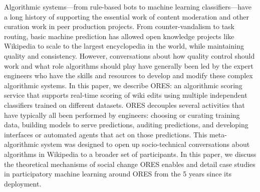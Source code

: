 Algorithmic systems---from rule-based bots to machine learning classifiers---have a long history of supporting the essential work of content moderation and other curation work in peer production projects.  From counter-vandalism to task routing, basic machine prediction has allowed open knowledge projects like Wikipedia to scale to the largest encyclopedia in the world, while maintaining quality and consistency.  However, conversations about how quality control should work and what role algorithms should play have generally been led by the expert engineers who have the skills and resources to develop and modify these complex algorithmic systems. In this paper, we describe ORES: an algorithmic scoring service that supports real-time scoring of wiki edits using multiple independent classifiers trained on different datasets. ORES decouples several activities that have typically all been performed by engineers: choosing or curating training data, building models to serve predictions, auditing predictions, and developing interfaces or automated agents that act on those predictions. This meta-algorithmic system was designed to open up socio-technical conversations about algorithms in Wikipedia to a broader set of participants.  In this paper, we discuss the theoretical mechanisms of social change ORES enables and detail case studies in participatory machine learning around ORES from the 5 years since its deployment.
